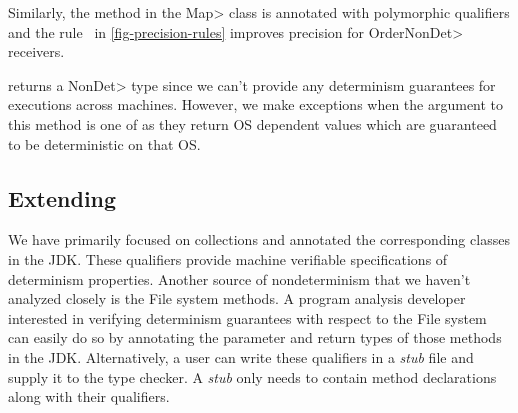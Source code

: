 Similarly, the  method in the \<Map> class is annotated with polymorphic qualifiers and the rule \ in \cref{fig-precision-rules} improves precision for \<OrderNonDet> receivers.

 returns a \<NonDet> type since we can't provide any determinism guarantees for
executions across machines. However, we make exceptions when the argument to this method is one of 
 as they return OS dependent values which are guaranteed to be deterministic on that OS.

\subsection{Extending \ourTypeSystem}\label{extending-det-checker}
We have primarily focused on collections and annotated the corresponding classes in the JDK.
These qualifiers provide machine verifiable specifications of determinism properties.
Another source of nondeterminism that we haven't analyzed closely is the File system methods.
A program analysis developer interested in verifying determinism guarantees with respect to 
the File system can easily do so by annotating the parameter and return types of those methods in the JDK.
Alternatively, a user can write these qualifiers in a \textit{stub} file and supply it to the type checker. A \textit{stub}
only needs to contain method declarations along with their qualifiers.

